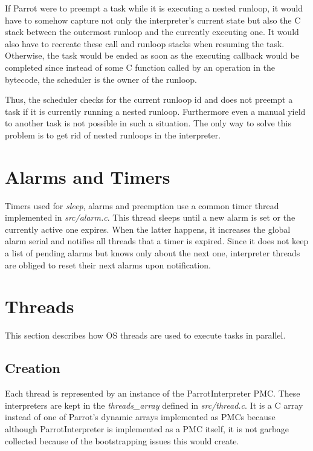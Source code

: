 \documentclass[bachelor,english]{hgbthesis}
\begin{document}
If Parrot were to preempt a task while it is executing a nested runloop, it would have to somehow capture not only the interpreter's current state but also the C stack between the outermost runloop and the currently executing one. It would also have to recreate these call and runloop stacks when resuming the task. Otherwise, the task would be ended as soon as the executing callback would be completed since instead of some C function called by an operation in the bytecode, the scheduler is the owner of the runloop.

Thus, the scheduler checks for the current runloop id and does not preempt a task if it is currently running a nested runloop. Furthermore even a manual yield to another task is not possible in such a situation. The only way to solve this problem is to get rid of nested runloops in the interpreter.

\section{Alarms and Timers}

Timers used for \textit{sleep}, alarms and preemption use a common timer thread implemented in \textit{src/alarm.c}. This thread sleeps until a new alarm is set or the currently active one expires. When the latter happens, it increases the global alarm serial and notifies all threads that a timer is expired. Since it does not keep a list of pending alarms but knows only about the next one, interpreter threads are obliged to reset their next alarms upon notification.

\section{Threads}

This section describes how OS threads are used to execute tasks in parallel.

\subsection{Creation}
\label{subsec:thread_creation}

Each thread is represented by an instance of the ParrotInterpreter PMC. These interpreters are kept in the \textit{threads\_array} defined in \textit{src/thread.c}. It is a C array instead of one of Parrot's dynamic arrays implemented as PMCs because although ParrotInterpreter is implemented as a PMC itself, it is not garbage collected because of the bootstrapping issues this would create.
\end{document}
